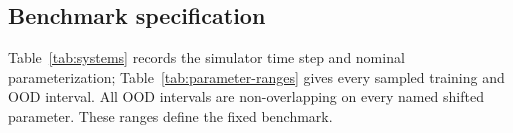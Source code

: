 \documentclass[iicol,pdflatex,sn-basic,Numbered]{sn-jnl}
\begin{document}
\backmatter
\begin{appendices}
\renewcommand{\theHtable}{appendix.\arabic{table}}
\renewcommand{\theHfigure}{appendix.\arabic{figure}}
\renewcommand{\theHequation}{appendix.\arabic{equation}}
\section{Benchmark specification}

Table~\ref{tab:systems} records the simulator time step and nominal
parameterization; Table~\ref{tab:parameter-ranges} gives every sampled training
and OOD interval. All OOD intervals are non-overlapping on every named shifted
parameter. These ranges define the fixed benchmark.

\begin{table}[ht]
\centering
\caption{Controlled-system definitions. $u$ is scalar in every system.}
\label{tab:systems}
\end{table}


\end{appendices}
\end{document}
